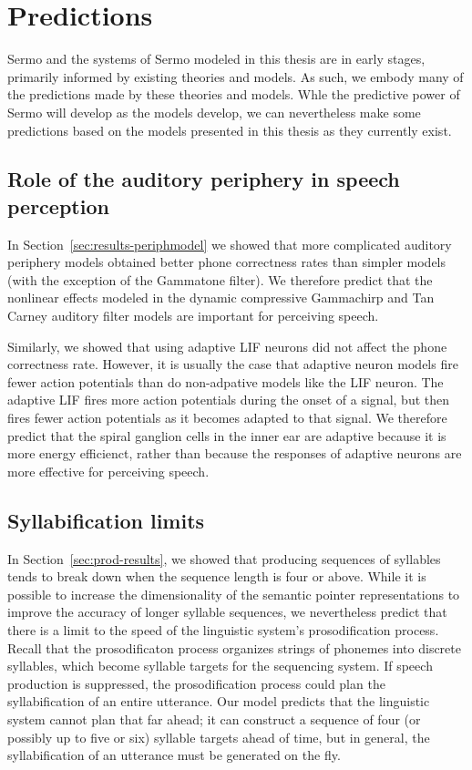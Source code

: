 \section{Predictions}

Sermo and the systems of Sermo modeled in this thesis
are in early stages,
primarily informed by existing
theories and models.
As such, we embody many of the predictions made
by these theories and models.
Whle the predictive power of Sermo
will develop as the models develop,
we can nevertheless make some predictions
based on the models presented in this thesis
as they currently exist.

\subsection{Role of the auditory periphery in speech perception}

In Section~\ref{sec:results-periphmodel} we showed
that more complicated auditory periphery models
obtained better phone correctness rates
than simpler models
(with the exception of the Gammatone filter).
We therefore predict that
the nonlinear effects modeled
in the dynamic compressive Gammachirp
and Tan Carney auditory filter models
are important for perceiving speech.

Similarly, we showed that using adaptive LIF neurons
did not affect the phone correctness rate.
However, it is usually the case that
adaptive neuron models fire fewer action potentials
than do non-adpative models like the LIF neuron.
The adaptive LIF fires more action potentials
during the onset of a signal,
but then fires fewer action potentials
as it becomes adapted to that signal.
We therefore predict that
the spiral ganglion cells in the inner ear
are adaptive because it is more energy efficienct,
rather than because the responses
of adaptive neurons are more effective
for perceiving speech.

\subsection{Syllabification limits}

In Section~\ref{sec:prod-results},
we showed that producing
sequences of syllables
tends to break down
when the sequence length is four or above.
While it is possible to increase the
dimensionality of the
semantic pointer representations
to improve the accuracy
of longer syllable sequences,
we nevertheless predict that
there is a limit to the speed
of the linguistic system's
prosodification process.
Recall that the prosodificaton process
organizes strings of phonemes
into discrete syllables,
which become syllable targets for
the sequencing system.
If speech production is suppressed,
the prosodification process
could plan the syllabification
of an entire utterance.
Our model predicts that
the linguistic system
cannot plan that far ahead;
it can construct a sequence of four
(or possibly up to five or six)
syllable targets ahead of time,
but in general,
the syllabification of an utterance
must be generated on the fly.

